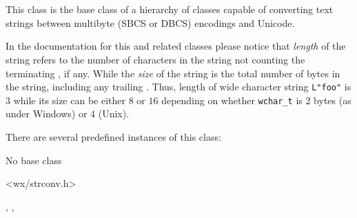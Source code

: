

\section{}\label{wxmbconv}

This class is the base class of a hierarchy of classes capable of converting
text strings between multibyte (SBCS or DBCS) encodings and Unicode.

In the documentation for this and related classes please notice that 
\emph{length} of the string refers to the number of characters in the string
not counting the terminating \NUL, if any. While the \emph{size} of the string
is the total number of bytes in the string, including any trailing \NUL.
Thus, length of wide character string \texttt{L"foo"} is $3$ while its size can
be either $8$ or $16$ depending on whether \texttt{wchar\_t} is $2$ bytes (as
under Windows) or $4$ (Unix).


There are several predefined instances of this class:
\begin{twocollist}
\end{twocollist}


No base class


<wx/strconv.h>


, 
, 




